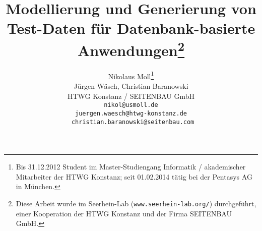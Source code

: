 \documentclass{lni}
\author{
	Nikolaus Moll\footnote{Bis 31.12.2012 Student im Master-Studiengang Informatik / akademischer Mitarbeiter der HTWG Konstanz; seit 01.02.2014 tätig bei der Pentasys AG in München.}
\\ Jürgen Wäsch, Christian Baranowski \\ 
	HTWG Konstanz / SEITENBAU GmbH\\ 
           \texttt{nikol@usmoll.de}\\ \texttt{juergen.waesch@htwg-konstanz.de}\\ \texttt{ christian.baranowski@seitenbau.com} 
}
\title{Modellierung und Generierung von Test-Daten für Datenbank-basierte Anwendungen\footnote{Diese Arbeit wurde im Seerhein-Lab (\texttt{www.seerhein-lab.org/}) durchgeführt, einer Kooperation der HTWG Konstanz und der Firma SEITENBAU GmbH.}}
\begin{document}
\maketitle




\begin{abstract}

%

\end{abstract}













\end{document}
